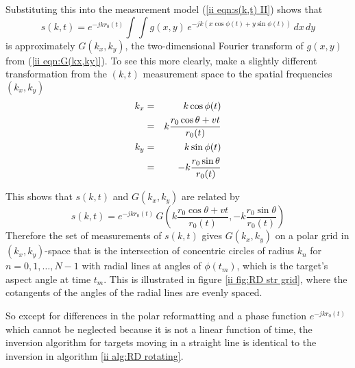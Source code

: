 Substituting this into the measurement model (\ref{ii eqn:s(k,t) II}) shows 
that
\begin{equation}
s(k,t)=e^{-jkr_0(t)}\int\!\!\int g(x,y)\,
	e^{-jk(x\cos\phi(t)+y\sin\phi(t))}\,dx\,dy
\end{equation}
is approximately $G(k_x,k_y)$, the two-dimensional Fourier transform 
of $g(x,y)$ from (\ref{ii eqn:G(kx,ky)}).  To see this more clearly, make
a slightly different transformation from the $(k,t)$ measurement space to the 
spatial frequencies $(k_x,k_y)$
\begin{eqnarray}
k_x&=&k\cos\phi(t) {\nonumber}\\
&=&k\frac{r_0\cos\theta+vt}{r_0(t)}\\
k_y&=&k\sin\phi(t) {\nonumber}\\
&=&-k\frac{r_0\sin\theta}{r_0(t)}
\end{eqnarray}

This shows that $s(k,t)$ and $G(k_x,k_y)$ are related by
\begin{equation}
s(k,t)=e^{-jkr_0(t)}\,G\left(k\frac{r_0\cos\theta+vt}{r_0(t)},
-k\frac{r_0\sin\theta}{r_0(t)}\right)
\end{equation}
Therefore the set of measurements of $s(k,t)$ gives $G(k_x,k_y)$ on a polar
grid in $(k_x,k_y)$-space that is the intersection of concentric circles of
radius $k_n$ for $n=0,1,\ldots,N-1$ with radial lines at angles of
$\phi(t_m)$, which is the target's aspect angle at time $t_m$. This is
illustrated in figure \ref{ii fig:RD str grid}, where the cotangents of the
angles of the radial lines are evenly spaced.

So except for differences in the polar reformatting and a phase function 
$e^{-jkr_0(t)}$ which cannot be neglected because it is not a linear 
function of time, the inversion algorithm for targets moving in a straight
line is identical to the inversion in algorithm \ref{ii alg:RD rotating}.


